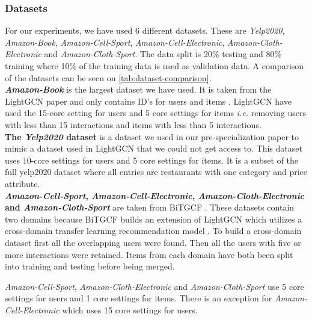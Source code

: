 \subsubsection{Datasets}

For our experiments, we have used 6 different datasets.
These are \textit{Yelp2020}, \textit{Amazon-Book}, \textit{Amazon-Cell-Sport}, \textit{Amazon-Cell-Electronic}, \textit{Amazon-Cloth-Electronic} and \textit{Amazon-Cloth-Sport}.
The data split is 20\% testing and 80\% training where 10\% of the training data is used as validation data.
A comparison of the datasets can be seen on \autoref{tab:dataset-comparison}.
\\
\textbf{\textit{Amazon-Book}} is the largest dataset we have used.
It is taken from the LightGCN paper and only contains ID's for users and items \cite{lightgcn}.
LightGCN have used the 15-core setting for users and 5 core settings for items \textit{i.e.} removing users with less than 15 interactions and items with less than 5 interactions.
\\
\textbf{The \textit{Yelp2020} dataset} is a dataset we used in our pre-specialization paper to mimic a dataset used in LightGCN that we could not get access to.
This dataset uses 10-core settings for users and 5 core settings for items.
It is a subset of the full yelp2020 dataset where all entries are restaurants with one category and price attribute.
\\
\textbf{\textit{Amazon-Cell-Sport}, \textit{Amazon-Cell-Electronic}, \textit{Amazon-Cloth-Electronic} and \textit{Amazon-Cloth-Sport}} are taken from BiTGCF \cite{BiTGCF}.
These datasets contain two domains because BiTGCF builds an extension of LightGCN which utilizes a cross-domain transfer learning recommendation model \cite{BiTGCF}.
To build a cross-domain dataset first all the overlapping users were found.
Then all the users with five or more interactions were retained.
Items from each domain have both been split into training and testing before being merged.

\textit{Amazon-Cell-Sport}, \textit{Amazon-Cloth-Electronic} and \textit{Amazon-Cloth-Sport} use 5 core settings for users and 1 core settings for items.
There is an exception for \textit{Amazon-Cell-Electronic} which uses 15 core settings for users.


